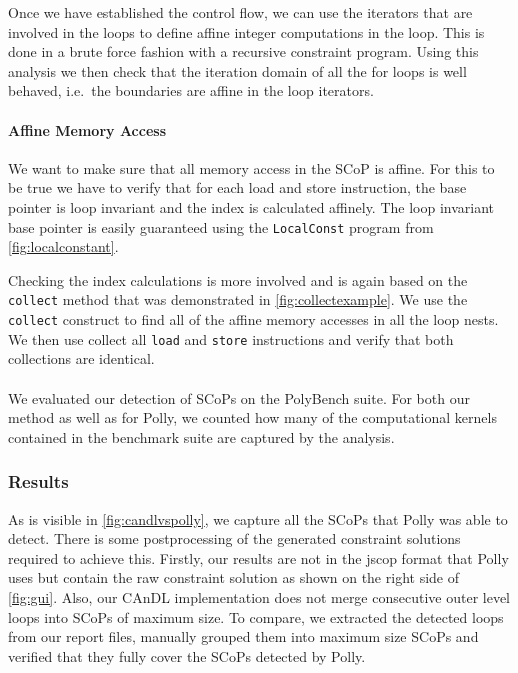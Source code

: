     Once we have established the control flow, we can use the iterators that are
    involved in the loops to define affine integer computations in the loop.
    This is done in a brute force fashion with a recursive constraint program.
    Using this analysis we then check that the iteration domain of all the for
    loops is well behaved, i.e.\ the boundaries are affine in the loop
    iterators.

    \paragraph{Affine Memory Access}
    We want to make sure that all memory access in the SCoP is affine.
    For this to be true we have to verify that for each load and store
    instruction, the base pointer is loop invariant and the index is calculated
    affinely.
    The loop invariant base pointer is easily guaranteed using the
    \texttt{LocalConst} program from \autoref{fig:localconstant}.

    Checking the index calculations is more involved and is again based on the
    \texttt{collect} method that was demonstrated in
    \autoref{fig:collectexample}.
    We use the \texttt{collect} construct to find all of the affine memory
    accesses in all the loop nests.
    We then use collect all \texttt{load} and \texttt{store} instructions and
    verify that both collections are identical.

    \paragraph{}
    We evaluated our detection of SCoPs on the PolyBench suite.
    For both our method as well as for Polly, we counted how many of the
    computational kernels contained in the benchmark suite are captured by the
    analysis.

\subsubsection{Results}

    As is visible in \autoref{fig:candlvspolly}, we capture all the SCoPs that Polly
    was able to detect.
    There is some postprocessing of the generated constraint solutions required
    to achieve this.
    Firstly, our results are not in the jscop format that Polly uses but contain
    the raw constraint solution as shown on the right side of \autoref{fig:gui}.
    Also, our CAnDL implementation does not merge consecutive outer level loops
    into SCoPs of maximum size.
    To compare, we extracted the detected loops from our report
    files, manually grouped them into maximum size SCoPs and verified that they
    fully cover the SCoPs detected by Polly.

